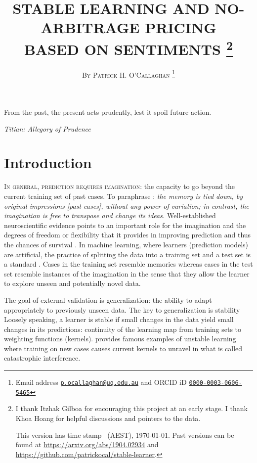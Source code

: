 \documentclass[12pt,a4paper,twoside]{article}
\title{\MakeUppercase{Stable learning and no-arbitrage pricing\\ based
on sentiments} \footnote{I thank Itzhak Gilboa for encouraging this project at
an early stage. I thank Khoa Hoang for helpful discussions and pointers to the
data.

    This version has time stamp \currenttime~(AEST), \today. Past versions can
    be found at \url{https://arxiv.org/abs/1904.02934} and
    \url{https://github.com/patrickocal/stable-learner}.}}
\author{\large\textsc{By Patrick H. O'Callaghan} \footnote{Email address
    \href{mailto:p.ocallaghan@uq.edu.au}{\texttt{p.ocallaghan@uq.edu.au}} and
    ORCID iD \href{http://orcid.org/0000-0003-0606-5465}{
      \texttt{0000-0003-0606-5465}}}}
\date{}
\begin{document}
  \maketitle
  \pagestyle{fancy}
\renewcommand{\abstractname}{\vspace{-\baselineskip}} \thispagestyle{plain}
%
\begin{abstract}
  
\end{abstract}
  \setlength{\epigraphwidth}{11.5cm} \epigraph{From the past, the
  present acts prudently, lest it spoil future action.}{\emph{Titian:  Allegory
  of Prudence} }

  \section{Introduction} \label{sec-introduction} \textsc{In general,
  prediction requires imagination}: the capacity to go beyond the current
  training set of past cases. To paraphrase \citep[pages 9 and
  10]{hume1896treatise}: \emph{the memory is tied down, by original impressions
  \emph{[past cases]}, without any power of variation; in contrast, the
  imagination is free to transpose and change its ideas.} Well-established
  neuroscientific evidence points to an important role for the imagination and
  the degrees of freedom or flexibility that it provides in improving
  prediction and thus the chances of survival
  \citep{bartlett1932remembering,suddendorf2007evolution,mullally2013memory}.
  In machine learning, where learners (prediction models) are artificial, the
  practice of splitting the data into a training set and a test set is a
  standard \citep{hastie2009elements}. Cases in the training set resemble
  memories whereas cases in the test set resemble instances of the imagination
  in the sense that they allow the learner to explore unseen and potentially
  novel data.

  The goal of external validation is generalization: the ability to adapt
  appropriately to previously unseen data.  The key to generalization is
  stability
  \citep{bousquet2002stability,poggio2004general,mukherjee2006learning} Loosely
  speaking, a learner is stable if small changes in the data yield small
  changes in its predictions: continuity of the learning map from training sets
  to weighting functions (kernels).  \cite{mccloskey1989catastrophic} provides
  famous examples of unstable learning where training on new cases causes
  current kernels to unravel in what is called catastrophic interference.
\end{document}
